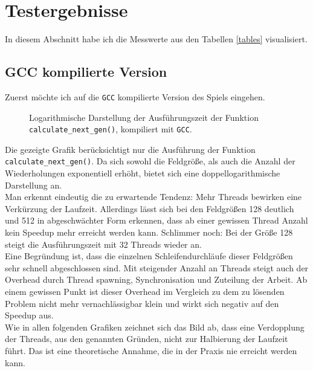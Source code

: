 \documentclass[german,plainarticle,hyperref,utf8]{zihpub}
\begin{document}
	\section{Testergebnisse} \label{erg}
	In diesem Abschnitt habe ich die Messwerte aus den Tabellen \ref{tables} visualisiert.
	\subsection{GCC kompilierte Version}
	Zuerst möchte ich auf die \texttt{GCC} kompilierte Version des Spiels eingehen.\\
	
	\begin{figure}[h]
		\begin{center}
			
		\end{center}
		\caption{Logarithmische Darstellung der Ausführungszeit der Funktion \texttt{calculate\_next\_gen()}, kompiliert mit \texttt{GCC}.}
	\end{figure}
	Die gezeigte Grafik berücksichtigt nur die Ausführung der Funktion \texttt{calculate\_next\_gen()}. Da sich sowohl die Feldgröße, als auch die Anzahl der Wiederholungen exponentiell erhöht, bietet sich eine doppellogarithmische Darstellung an.\\
	Man erkennt eindeutig die zu erwartende Tendenz: Mehr Threads bewirken eine Verkürzung der Laufzeit. Allerdings lässt sich bei den Feldgrößen 128 deutlich und 512 in abgeschwächter Form erkennen, dass ab einer gewissen Thread Anzahl kein Speedup mehr erreicht werden kann. Schlimmer noch: Bei der Größe 128 steigt die Ausführungszeit mit 32 Threads wieder an.\\
	Eine Begründung ist, dass die einzelnen Schleifendurchläufe dieser Feldgrößen sehr schnell abgeschlossen sind. Mit steigender Anzahl an Threads steigt auch der Overhead durch Thread spawning, Synchronisation und Zuteilung der Arbeit. Ab einem gewissen Punkt ist dieser Overhead im Vergleich zu dem zu lösenden Problem nicht mehr vernachlässigbar klein und wirkt sich negativ auf den Speedup aus.\\
	Wie in allen folgenden Grafiken zeichnet sich das Bild ab, dass eine Verdopplung der Threads, aus den genannten Gründen, nicht zur Halbierung der Laufzeit führt. Das ist eine theoretische Annahme, die in der Praxis nie erreicht werden kann.\\
	
\end{document}
